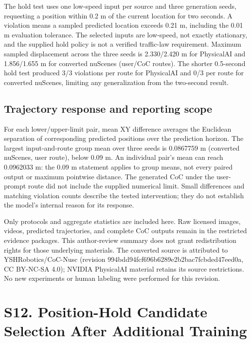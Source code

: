 \documentclass[11pt,a4paper]{article}
\begin{document}
The hold test uses one low-speed input per source and three generation seeds, requesting a position within 0.2 m of the current location for two seconds. A violation means a sampled predicted location exceeds 0.21 m, including the 0.01 m evaluation tolerance. The selected inputs are low-speed, not exactly stationary, and the supplied hold policy is not a verified traffic-law requirement. Maximum sampled displacement across the three seeds is 2.330/2.420 m for PhysicalAI and 1.856/1.655 m for converted nuScenes (user/CoC routes). The shorter 0.5-second hold test produced 3/3 violations per route for PhysicalAI and 0/3 per route for converted nuScenes, limiting any generalization from the two-second result.\par

\subsection*{Trajectory response and reporting scope}

For each lower/upper-limit pair, mean XY difference averages the Euclidean separation of corresponding predicted positions over the prediction horizon. The largest input-and-route group mean over three seeds is 0.0867759 m (converted nuScenes, user route), below 0.09 m. An individual pair's mean can reach 0.0962033 m: the 0.09 m statement applies to group means, not every paired output or maximum pointwise distance. The generated CoC under the user-prompt route did not include the supplied numerical limit. Small differences and matching violation counts describe the tested intervention; they do not establish the model's internal reason for its response.\par

Only protocols and aggregate statistics are included here. Raw licensed images, videos, predicted trajectories, and complete CoC outputs remain in the restricted evidence packages. This author-review summary does not grant redistribution rights for those underlying materials. The converted source is attributed to YSHRobotics/CoC-Nusc (revision 994bdd94fcf696b6289e2b2bac7fcbded47eed0a, CC BY-NC-SA 4.0); NVIDIA PhysicalAI material retains its source restrictions. No new experiments or human labeling were performed for this revision.\par

\section*{S12. Position-Hold Candidate Selection After Additional Training}
\end{document}
